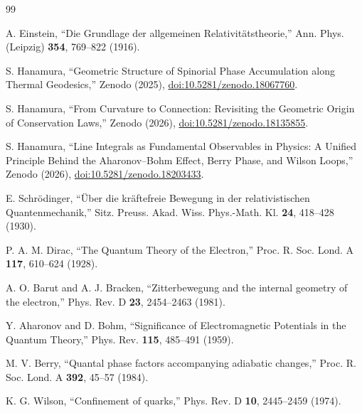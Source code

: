 \documentclass[%
 reprint,
 amsmath,amssymb,
 aps,
 prb,
]{revtex4-2}
\numberwithin{equation}{section}
\begin{document}
\begin{thebibliography}{99}

A. Einstein, ``Die Grundlage der allgemeinen Relativit{\"a}tstheorie,'' Ann. Phys. (Leipzig) \textbf{354}, 769--822 (1916).

S. Hanamura, ``Geometric Structure of Spinorial Phase Accumulation along Thermal Geodesics,'' Zenodo (2025), \href{https://doi.org/10.5281/zenodo.18067760}{doi:10.5281/zenodo.18067760}.

S. Hanamura, ``From Curvature to Connection: Revisiting the Geometric Origin of Conservation Laws,'' Zenodo (2026), \href{https://doi.org/10.5281/zenodo.18135855}{doi:10.5281/zenodo.18135855}.

S. Hanamura, ``Line Integrals as Fundamental Observables in Physics: A Unified Principle Behind the Aharonov--Bohm Effect, Berry Phase, and Wilson Loops,'' Zenodo (2026), \href{https://doi.org/10.5281/zenodo.18203433}{doi:10.5281/zenodo.18203433}.

E. Schr{\"o}dinger, ``{\"U}ber die kr{\"a}ftefreie Bewegung in der relativistischen Quantenmechanik,'' Sitz. Preuss. Akad. Wiss. Phys.-Math. Kl. \textbf{24}, 418--428 (1930).

P. A. M. Dirac, ``The Quantum Theory of the Electron,'' Proc. R. Soc. Lond. A \textbf{117}, 610--624 (1928).

A. O. Barut and A. J. Bracken, ``Zitterbewegung and the internal geometry of the electron,'' Phys. Rev. D \textbf{23}, 2454--2463 (1981).

Y. Aharonov and D. Bohm, ``Significance of Electromagnetic Potentials in the Quantum Theory,'' Phys. Rev. \textbf{115}, 485--491 (1959).

M. V. Berry, ``Quantal phase factors accompanying adiabatic changes,'' Proc. R. Soc. Lond. A \textbf{392}, 45--57 (1984).

K. G. Wilson, ``Confinement of quarks,'' Phys. Rev. D \textbf{10}, 2445--2459 (1974).


\end{thebibliography}
\end{document}
